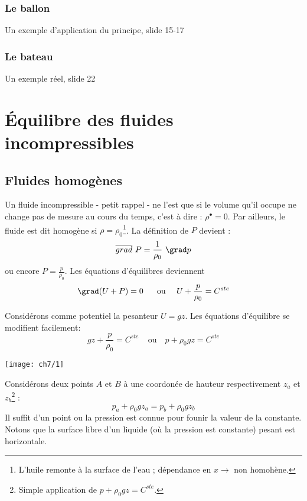 \subsubsection{Le ballon}
Un exemple d'application du principe, slide 15-17
	    
\subsubsection{Le bateau}
Un exemple réel, slide 22
	    

\section{Équilibre des fluides incompressibles}
\subsection{Fluides homogènes}
Un fluide incompressible - petit rappel - ne l'est que si le volume qu'il occupe
ne change pas de mesure au cours du temps, c'est à dire : $\rho^\bullet = 0$. Par 
ailleurs, le fluide est dit homogène si $\rho = \rho_0$\footnote{L'huile remonte 
	à la surface de l'eau ; dépendance en $x \rightarrow$ non homohène.}. La 
définition de $P$ 	devient :
\begin{equation}
	\overline{grad}\ P = \frac{1}{\rho_0}\ \grad p
\end{equation}
ou encore $P = \frac{p}{\rho_0}$. Les équations d'équilibres deviennent
\begin{equation}
	\grad (U + P) = 0\ \ \ \ \ \text{ou }\ \ \ U + \frac{p}{\rho_0} = C^{ste}
\end{equation}
	
Considérons comme potentiel la pesanteur $U = gz$. Les équations d'équilibre se
modifient facilement:
\begin{equation}
	gz + \frac{p}{\rho_0} = C^{ste}\ \ \ \ \ \text{ou }\ \ \ p+\rho_0gz = C^{ste}
\end{equation}
\begin{center}
	\texttt{[image: ch7/1]}
\end{center}
	
Considérons deux points $A$ et $B$ à une coordonée de hauteur respectivement 
$z_a$ et $z_b$\footnote{Simple application de $p+\rho_0gz = C^{ste}$.} :
\begin{equation}
	p_a +\rho_0 gz_a = p_b +\rho_0gz_b
\end{equation}
Il suffit d'un point ou la pression est connue pour founir la valeur de la 
constante. Notons que la surface libre d'un liquide (où la pression est 
constante) pesant est horizontale.
	
